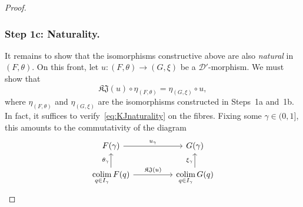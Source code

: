 \documentclass[a4paper, 11pt,reqno]{amsart}
\newcommand{\D}{\mathcal{D}}
\newcommand{\J}{\mathfrak{J}}
\newcommand{\K}{\mathfrak{K}}
\DeclareMathOperator*{\colim}{colim}
\begin{document}
\begin{proof}
\subsubsection*{Step 1c: Naturality.}  It remains to show that the isomorphisms constructive above are also {\em natural} in $(F,\theta)$. On this front, let $u\colon (F,\theta)\rightarrow (G,\xi)$ be a $\D'$-morphism. We must show that 
\begin{equation}\label{eq:KJnaturality}
\K\J(u)\circ\eta_{(F,\theta)}
=
\eta_{(G,\xi)}\circ u,
\end{equation}
where $\eta_{(F,\theta)}$ and $\eta_{(G,\xi)}$ are the isomorphisms
constructed in Steps~1a and~1b. In fact, it suffices to verify~\eqref{eq:KJnaturality} on the fibres. Fixing some $\gamma\in (0,1]$, this amounts to the commutativity of the diagram 
	\begin{equation}
\begin{tikzcd}\label{eq:KJnaturality-fibre}
F(\gamma) \ar[rr,"u_\gamma"] && G(\gamma)\\
\displaystyle\colim_{q\in I_\gamma} F(q) \ar[u,"\theta_{\gamma}"] \ar[rr,"\K\J(u)"]&& \displaystyle\colim_{q\in I_\gamma} G(q) \ar[u,"\xi_{\gamma}"]
\end{tikzcd}
\end{equation}


\end{proof}
\end{document}
